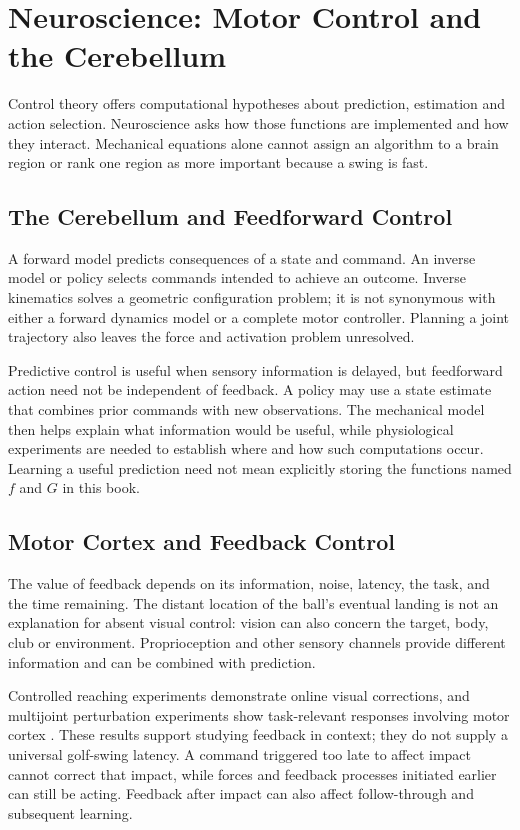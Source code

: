 \section{Neuroscience: Motor Control and the Cerebellum}

Control theory offers computational hypotheses about prediction, estimation and action selection. Neuroscience asks how those functions are implemented and how they interact. Mechanical equations alone cannot assign an algorithm to a brain region or rank one region as more important because a swing is fast.

\subsection{The Cerebellum and Feedforward Control}

A forward model predicts consequences of a state and command. An inverse model or policy selects commands intended to achieve an outcome. Inverse kinematics solves a geometric configuration problem; it is not synonymous with either a forward dynamics model or a complete motor controller. Planning a joint trajectory also leaves the force and activation problem unresolved.

Predictive control is useful when sensory information is delayed, but feedforward action need not be independent of feedback. A policy may use a state estimate that combines prior commands with new observations. The mechanical model then helps explain what information would be useful, while physiological experiments are needed to establish where and how such computations occur. Learning a useful prediction need not mean explicitly storing the functions named $f$ and $G$ in this book.

\subsection{Motor Cortex and Feedback Control}

The value of feedback depends on its information, noise, latency, the task, and the time remaining. The distant location of the ball's eventual landing is not an explanation for absent visual control: vision can also concern the target, body, club or environment. Proprioception and other sensory channels provide different information and can be combined with prediction.

Controlled reaching experiments demonstrate online visual corrections, and multijoint perturbation experiments show task-relevant responses involving motor cortex \citep{Saunders2003Feedback,Pruszynski2011Feedback}. These results support studying feedback in context; they do not supply a universal golf-swing latency. A command triggered too late to affect impact cannot correct that impact, while forces and feedback processes initiated earlier can still be acting. Feedback after impact can also affect follow-through and subsequent learning.

